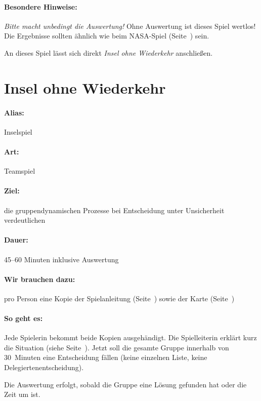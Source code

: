 \paragraph{Besondere Hinweise:} \emph{Bitte macht unbedingt die Auswertung!} Ohne Auswertung ist dieses Spiel wertlos! Die Ergebnisse sollten ähnlich wie beim NASA-Spiel (Seite~\pageref{nasa}) sein.

An dieses Spiel lässt sich direkt \emph{Insel ohne Wiederkehr} anschließen.

\section{Insel ohne Wiederkehr}
\paragraph{Alias:} Inselspiel
\paragraph{Art:} Teamspiel
\paragraph{Ziel:} die gruppendynamischen Prozesse bei Entscheidung unter Unsicherheit verdeutlichen
\paragraph{Dauer:} 45--60 Minuten inklusive Auswertung
\paragraph{Wir brauchen dazu:} pro Person eine Kopie der Spielanleitung (Seite~\pageref{wiederkehr-kopien}) sowie der Karte (Seite~\pageref{wiederkehr-karte})
\paragraph{So geht es:} Jede Spielerin bekommt beide Kopien ausgehändigt. Die Spielleiterin erklärt kurz die Situation (siehe Seite~\pageref{wiederkehr-kopien}). Jetzt soll die gesamte Gruppe innerhalb von 30~Minuten eine Entscheidung fällen (keine einzelnen Liste, keine Delegiertenentscheidung).

Die Auswertung erfolgt, sobald die Gruppe eine Lösung gefunden hat oder die Zeit um ist.

